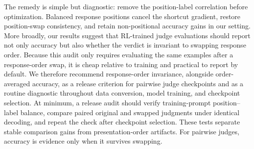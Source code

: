 \documentclass[letterpaper]{article}
\begin{document}
The remedy is simple but diagnostic: remove the position-label correlation before optimization. Balanced response positions cancel the shortcut gradient, restore position-swap consistency, and retain non-positional accuracy gains in our setting. More broadly, our results suggest that RL-trained judge evaluations should report not only accuracy but also whether the verdict is invariant to swapping response order. Because this audit only requires evaluating the same examples after a response-order swap, it is cheap relative to training and practical to report by default. We therefore recommend response-order invariance, alongside order-averaged accuracy, as a release criterion for pairwise judge checkpoints and as a routine diagnostic throughout data conversion, model training, and checkpoint selection. At minimum, a release audit should verify training-prompt position--label balance, compare paired original and swapped judgments under identical decoding, and repeat the check after checkpoint selection. These tests separate stable comparison gains from presentation-order artifacts. For pairwise judges, accuracy is evidence only when it survives swapping.

\clearpage

\end{document}
